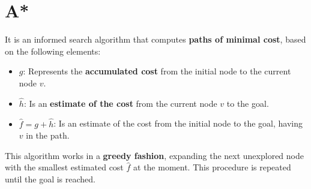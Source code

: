 \begin{minipage}{0.3\textwidth}
\section*{A*}

It is an informed search algorithm that computes
\textbf{paths of minimal cost}, based on 
the following elements:

\begin{itemize}
\item $g$: Represents the \textbf{accumulated cost} from
the initial node to the current node $v$.
\item $\hat{h}$: Is an \textbf{estimate of the cost} from
the current node $v$ to the goal.
\item $\hat{f} = g + \hat{h}$: Is an estimate of the cost from
the initial node to the goal, having $v$ in the path.
\end{itemize}

\bigskip
This algorithm works in a \textbf{greedy fashion},
expanding the next unexplored  node with the smallest
estimated cost $\hat{f}$ at the moment. 
This procedure is repeated until the goal is reached.

\end{minipage}